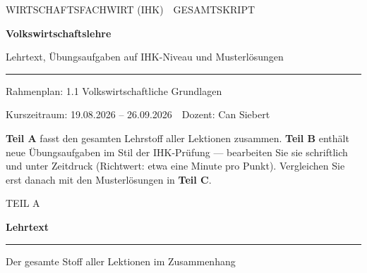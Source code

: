 \documentclass[11pt, a4paper]{article}
\begin{document}
\thispagestyle{empty}
\vspace*{3cm}
{\bfwlabelfont\color{bfwPrimary}WIRTSCHAFTSFACHWIRT (IHK) \,\textperiodcentered\, GESAMTSKRIPT\par}
\vspace{0.8em}
{\fontsize{34}{40}\selectfont\bfseries\color{bfwPrimaryDark}Volkswirtschaftslehre\par}
\vspace{0.8em}
{\Large\color{bfwInkSoft}Lehrtext, Übungsaufgaben auf IHK-Niveau und Musterlösungen\par}
\vspace{1.2em}
{\color{bfwPrimary}\rule{\linewidth}{2pt}}\par
\vspace{0.8em}
{\small\color{bfwInkSoft}Rahmenplan: 1.1 Volkswirtschaftliche Grundlagen\par
Kurszeitraum: 19.08.2026 -- 26.09.2026 \,\textperiodcentered\, Dozent: Can Siebert\par}
\vfill
\begin{merksatz}[title={\bfseries So arbeiten Sie mit diesem Skript}]
\textbf{Teil A} fasst den gesamten Lehrstoff aller Lektionen zusammen.
\textbf{Teil B} enthält neue Übungsaufgaben im Stil der IHK-Prüfung --- bearbeiten Sie sie
schriftlich und unter Zeitdruck (Richtwert: etwa eine Minute pro Punkt).
Vergleichen Sie erst danach mit den Musterlösungen in \textbf{Teil C}.
\end{merksatz}
\clearpage
\tableofcontents

\clearpage
{}
\vspace*{5cm}
{\bfwlabelfont\color{bfwPrimary}TEIL A\par}
\vspace{0.5em}
{\Huge\bfseries\color{bfwPrimaryDark}Lehrtext\par}
\vspace{0.6em}
{\color{bfwPrimary}\rule{\linewidth}{2pt}}\par
\vspace{0.6em}
{\large\color{bfwInkSoft}Der gesamte Stoff aller Lektionen im Zusammenhang\par}
\clearpage

\clearpage
\end{document}
